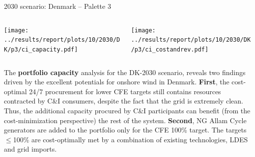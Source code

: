   \begin{frame}{2030 scenario: Denmark -- Palette 3}
  
    {\footnotesize
  
    \begin{columns}
    \begin{column}{7cm}
    \centering
    \texttt{[image: ../results/report/plots/10/2030/DK/p3/ci\_capacity.pdf]}
    \end{column}
  
    \begin{column}{8cm}
    \centering
    \texttt{[image: ../results/report/plots/10/2030/DK/p3/ci\_costandrev.pdf]}
    \end{column}
  
    \end{columns}
  
    \begin{columns}
    \begin{column}{15cm}
    The {\bf portfolio capacity} analysis for the DK-2030 scenario,
    reveals two findings driven by the excellent potentials for onshore wind in Denmark.
    {\bf First}, the cost-optimal 24/7 procurement for lower CFE targets
    still contains resources contracted by C\&I consumers, despite the fact that the grid is extremely clean.
    Thus, the additional capacity procured by C\&I participants can benefit 
    (from the cost-minimization perspective) the rest of the system.
    {\bf Second}, NG Allam Cycle generators are added to the portfolio \alert{only for the CFE 100\% target}. 
    The targets $\leq$100\% are cost-optimally met by a combination of existing technologies, LDES and grid imports. 
      
    \end{column}
    \end{columns}
    }
  
  \end{frame}





